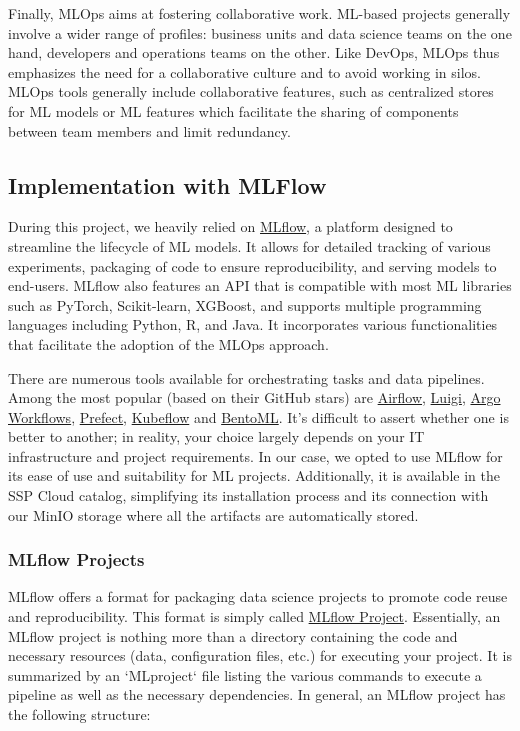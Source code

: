 Finally, MLOps aims at fostering collaborative work. ML-based projects generally involve a wider range of profiles: business units and data science teams on the one hand, developers and operations teams on the other. Like DevOps, MLOps thus emphasizes the need for a collaborative culture and to avoid working in silos. MLOps tools generally include collaborative features, such as centralized stores for ML models or ML features which facilitate the sharing of components between team members and limit redundancy.

\subsection{Implementation with MLFlow}

During this project, we heavily relied on \href{https://github.com/MLflow/MLflow}{MLflow}, a platform designed to streamline the lifecycle of ML models. It allows for detailed tracking of various experiments, packaging of code to ensure reproducibility, and serving models to end-users. MLflow also features an API that is compatible with most ML libraries such as PyTorch, Scikit-learn, XGBoost, and supports multiple programming languages including Python, R, and Java. It incorporates various functionalities that facilitate the adoption of the MLOps approach.

There are numerous tools available for orchestrating tasks and data pipelines. Among the most popular (based on their GitHub stars) are \href{https://github.com/apache/airflow}{Airflow}, \href{https://github.com/spotify/luigi}{Luigi}, \href{https://github.com/argoproj/argo-workflows}{Argo Workflows}, \href{https://github.com/PrefectHQ/prefect}{Prefect}, \href{https://github.com/kubeflow/kubeflow}{Kubeflow} and \href{https://github.com/bentoml/BentoML}{BentoML}. It's difficult to assert whether one is better to another; in reality, your choice largely depends on your IT infrastructure and project requirements. In our case, we opted to use MLflow for its ease of use and suitability for ML projects. Additionally, it is available in the SSP Cloud catalog, simplifying its installation process and its connection with our MinIO storage where all the artifacts are automatically stored.

\subsubsection{MLflow Projects}

MLflow offers a format for packaging data science projects to promote code reuse and reproducibility. This format is simply called \href{https://MLflow.org/docs/latest/projects.html}{MLflow Project}. Essentially, an MLflow project is nothing more than a directory containing the code and necessary resources (data, configuration files, etc.) for executing your project. It is summarized by an `MLproject` file listing the various commands to execute a pipeline as well as the necessary dependencies. In general, an MLflow project has the following structure:

